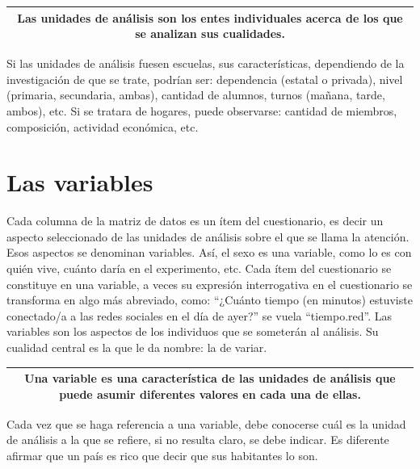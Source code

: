 \documentclass[]{book}
\begin{document}
\begin{longtable}[]{@{}c@{}}
\toprule
\endhead
\begin{minipage}[t]{0.97\columnwidth}\centering
Las \textbf{unidades de análisis} son los entes individuales acerca de los que se analizan sus cualidades.\strut
\end{minipage}\tabularnewline
\bottomrule
\end{longtable}

Si las unidades de análisis fuesen escuelas, sus características, dependiendo de la investigación de que se trate, podrían ser: dependencia (estatal o privada), nivel (primaria, secundaria, ambas), cantidad de alumnos, turnos (mañana, tarde, ambos), etc. Si se tratara de hogares, puede observarse: cantidad de miembros, composición, actividad económica, etc.

\hypertarget{las-variables}{%
\section{Las variables}\label{las-variables}}

Cada columna de la matriz de datos es un ítem del cuestionario, es decir un aspecto seleccionado de las unidades de análisis sobre el que se llama la atención. Esos aspectos se denominan variables. Así, el sexo es una variable, como lo es con quién vive, cuánto daría en el experimento, etc. Cada ítem del cuestionario se constituye en una variable, a veces su expresión interrogativa en el cuestionario se transforma en algo más abreviado, como: ``¿Cuánto tiempo (en minutos) estuviste conectado/a a las redes sociales en el día de ayer?'' se vuela ``tiempo.red''. Las variables son los aspectos de los individuos que se someterán al análisis. Su cualidad central es la que le da nombre: la de variar.

\begin{longtable}[]{@{}c@{}}
\toprule
\endhead
\begin{minipage}[t]{0.97\columnwidth}\centering
Una \textbf{variable} es una característica de las unidades de análisis que puede asumir diferentes valores en cada una de ellas.\strut
\end{minipage}\tabularnewline
\bottomrule
\end{longtable}

Cada vez que se haga referencia a una variable, debe conocerse cuál es la unidad de análisis a la que se refiere, si no resulta claro, se debe indicar. Es diferente afirmar que un país es rico que decir que sus habitantes lo son.
\end{document}
